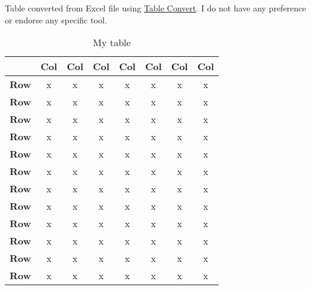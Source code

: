 Table converted from Excel file using \href{https://tableconvert.com/excel-to-latex}{Table Convert}. I do not have any preference or endorse any specific tool.

\begin{table}[!htbp]
    \centering
    \caption{My table}
    \begin{tabular}{|c|ccccccc|}
    \hline
        \textbf{} & \textbf{Col} & \textbf{Col} & \textbf{Col} & \textbf{Col} & \textbf{Col} & \textbf{Col} & \textbf{Col} \\ \hline
        \textbf{Row} & x & x & x & x & x & x & x \\ 
        \textbf{Row} & x & x & x & x & x & x & x \\ 
        \textbf{Row} & x & x & x & x & x & x & x \\ 
        \textbf{Row} & x & x & x & x & x & x & x \\ 
        \textbf{Row} & x & x & x & x & x & x & x \\ 
        \textbf{Row} & x & x & x & x & x & x & x \\ 
        \textbf{Row} & x & x & x & x & x & x & x \\ 
        \textbf{Row} & x & x & x & x & x & x & x \\ 
        \textbf{Row} & x & x & x & x & x & x & x \\ 
        \textbf{Row} & x & x & x & x & x & x & x \\ 
        \textbf{Row} & x & x & x & x & x & x & x \\ 
        \textbf{Row} & x & x & x & x & x & x & x \\ \hline
    \end{tabular}
\end{table}


